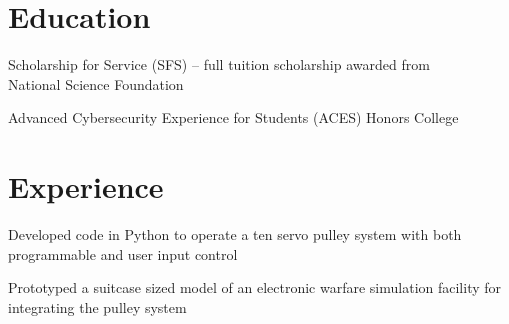 \documentclass[]{deedy-resume-openfont}
\begin{document}
\begin{minipage}[t]{0.66\textwidth} 

\section{Education} 

 \vspace{1mm}
\vspace{\topsep}
\begin{tightemize}
\item Scholarship for Service (SFS) – {\small full tuition scholarship awarded from \\National Science Foundation}
\item {\small Advanced Cybersecurity Experience for Students} (ACES) Honors College
\end{tightemize}
\sectionsep


\section{Experience}

\begin{tightemize}
\item Developed code in Python to operate a ten servo pulley system with both programmable and user input control
\item Prototyped a suitcase sized model of an electronic warfare simulation facility for integrating the pulley system
\end{tightemize}


\end{minipage}
\end{document}
